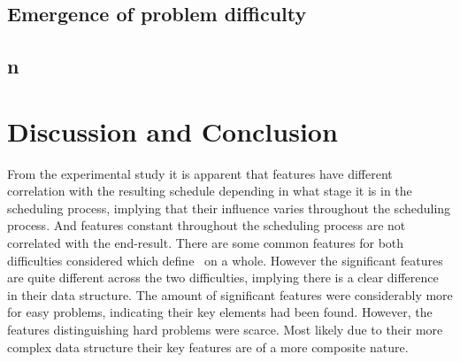 
{\setlength{\tabcolsep}{3pt}






}

\subsection{Emergence of problem difficulty}\label{sec:diff:stepwise}
\subsection{\Jrnd}\label{sec:easyhard:jrnd}
\subsection{\Jrndn}\label{sec:easyhard:jrndn}
\subsection{}\label{sec:easyhard:frnd}
\subsection{n}\label{sec:easyhard:frndn}
\subsection{\Fjc}\label{sec:easyhard:fjc}
\subsection{\Fmc}\label{sec:easyhard:fmc}
\subsection{\Fmxc}\label{sec:easyhard:fmxc}

\section{Discussion and Conclusion}
From the experimental study it is apparent that features have different %
correlation with the resulting schedule depending in what stage it is in the scheduling process, implying that their influence varies throughout the scheduling process. And features constant throughout the scheduling process are not correlated with the end-result.
There are some common features for both difficulties considered which define \JSP\ on a whole. However the significant features are quite different across the two difficulties, implying there is a clear difference in their data structure. The amount of significant features were considerably more for easy problems, indicating their key elements had been found. However, the features distinguishing hard problems were scarce. Most likely due to their more complex data structure their key features are of a more composite nature.

